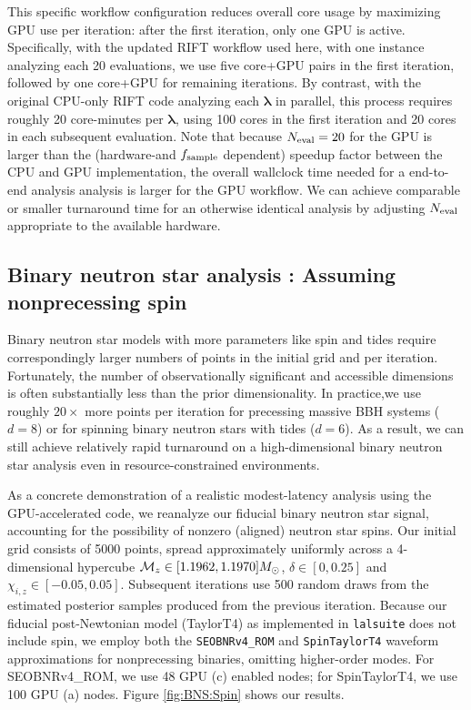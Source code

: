 \documentclass[twocolumn,prd,nofootinbib]{revtex4}
\newcommand\AddedResponse[1]{{\color{blue} {#1}}}
\newcommand{\mc}{{\cal M}}
\begin{document}
This specific workflow configuration  reduces overall core usage by maximizing GPU use per iteration: after the first
iteration, only one GPU is active.   
Specifically,  with the updated RIFT workflow used here, with one instance analyzing each 20 evaluations,  we use five
core+GPU pairs in the
first iteration, followed by one core+GPU for remaining iterations.
By contrast, with the original CPU-only RIFT code analyzing each $\bm{\lambda}$ in parallel, this process requires roughly 20 core-minutes
per $\bm{\lambda}$, using 100 cores in the first iteration and 20 cores in each
subsequent evaluation.   
Note that  because   $N_{\rm eval}=20$ for the GPU is larger than the (hardware-and $f_{\rm sample}$ dependent)  speedup factor between the CPU and
GPU implementation, the overall wallclock time needed for a end-to-end
analysis analysis is larger for the GPU workflow.
We can achieve comparable or smaller turnaround time for an otherwise identical analysis by adjusting $N_{\rm eval}$ appropriate to the available hardware.









\subsection{Binary neutron star analysis : Assuming  nonprecessing spin}
\label{sec:sub:BNS_spin}


Binary neutron star models with more parameters like spin and tides require correspondingly larger numbers of points in the
  initial grid and per iteration.  Fortunately, the number of observationally significant and accessible dimensions is often
  substantially less than the  prior  dimensionality.  In practice,we use roughly $20\times$ more points per
  iteration for precessing massive BBH systems ($d=8$) or for spinning binary neutron stars with tides ($d=6$).    As a
  result, we can still achieve relatively rapid turnaround on a high-dimensional binary neutron star analysis even in
  resource-constrained environments.

As a concrete demonstration of a realistic modest-latency analysis using the GPU-accelerated code, we reanalyze our fiducial binary
neutron star signal, accounting for the possibility of nonzero (aligned) neutron star spins.  Our initial grid consists
of 5000 points, spread \AddedResponse{approximately} uniformly across a 4-dimensional
hypercube $\mc_z\in[1.1962,1.1970] M_\odot$, $\delta \in[0,0.25]$ and $\chi_{i,z}\in[-0.05,0.05]$.  Subsequent
iterations use 500 random draws from the estimated posterior samples produced from the previous iteration.  
Because  our fiducial post-Newtonian model (TaylorT4) as implemented in \texttt{lalsuite}\cite{lalsuite} does not include spin, we
employ both the \texttt{SEOBNRv4\_ROM} and \texttt{SpinTaylorT4} waveform approximations for nonprecessing binaries,
omitting higher-order modes.   For SEOBNRv4\_ROM, we use 48 GPU (c) enabled nodes; for SpinTaylorT4, we use 100 GPU (a) nodes.
%
Figure \ref{fig:BNS:Spin} shows our results.
%
\end{document}
